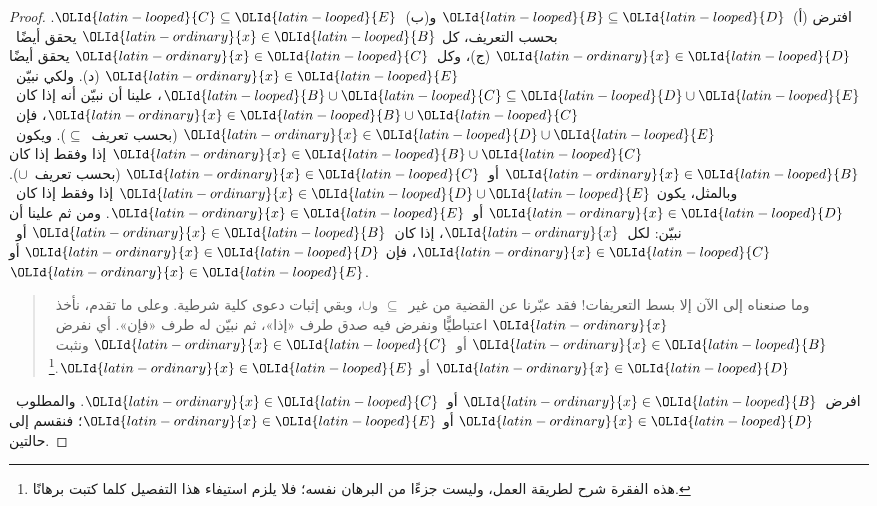 \documentclass[../../../include/open-logic-section]{subfiles}
\begin{document}
\begin{proof}
  افترض (أ)~${\OLId{latin-looped}{B}} \subseteq {\OLId{latin-looped}{D}}$ و(ب)~${\OLId{latin-looped}{C}} \subseteq {\OLId{latin-looped}{E}}$. بحسب التعريف، كل
  ${\OLId{latin-ordinary}{x}} \in {\OLId{latin-looped}{B}}$ يحقق أيضًا~${\OLId{latin-ordinary}{x}} \in {\OLId{latin-looped}{D}}$ (ج)، وكل~${\OLId{latin-ordinary}{x}} \in {\OLId{latin-looped}{C}}$ يحقق أيضًا
  ${\OLId{latin-ordinary}{x}} \in {\OLId{latin-looped}{E}}$ (د). ولكي نبيّن~${\OLId{latin-looped}{B}} \cup {\OLId{latin-looped}{C}} \subseteq {\OLId{latin-looped}{D}} \cup {\OLId{latin-looped}{E}}$، علينا أن
  نبيّن أنه إذا كان~${\OLId{latin-ordinary}{x}} \in {\OLId{latin-looped}{B}} \cup {\OLId{latin-looped}{C}}$، فإن~${\OLId{latin-ordinary}{x}} \in {\OLId{latin-looped}{D}} \cup {\OLId{latin-looped}{E}}$ (بحسب
  تعريف~$\subseteq$). ويكون~${\OLId{latin-ordinary}{x}} \in {\OLId{latin-looped}{B}} \cup {\OLId{latin-looped}{C}}$ إذا وفقط إذا كان
  ${\OLId{latin-ordinary}{x}} \in {\OLId{latin-looped}{B}}$ أو~${\OLId{latin-ordinary}{x}} \in {\OLId{latin-looped}{C}}$ (بحسب تعريف~$\cup$). وبالمثل، يكون
  ${\OLId{latin-ordinary}{x}} \in {\OLId{latin-looped}{D}} \cup {\OLId{latin-looped}{E}}$ إذا وفقط إذا كان~${\OLId{latin-ordinary}{x}} \in {\OLId{latin-looped}{D}}$ أو~${\OLId{latin-ordinary}{x}} \in {\OLId{latin-looped}{E}}$. ومن ثم
  علينا أن نبيّن: لكل~${\OLId{latin-ordinary}{x}}$، إذا كان~${\OLId{latin-ordinary}{x}} \in {\OLId{latin-looped}{B}}$ أو~${\OLId{latin-ordinary}{x}} \in {\OLId{latin-looped}{C}}$، فإن
  ${\OLId{latin-ordinary}{x}} \in {\OLId{latin-looped}{D}}$ أو~${\OLId{latin-ordinary}{x}} \in {\OLId{latin-looped}{E}}$.

  \begin{quote}
  وما صنعناه إلى الآن إلا بسط التعريفات!{} فقد عبّرنا عن القضية من
  غير~$\subseteq$ و$\cup$، وبقي إثبات دعوى كلية شرطية. وعلى ما تقدم،
  نأخذ~${\OLId{latin-ordinary}{x}}$ اعتباطيًّا ونفرض فيه صدق طرف «إذا»، ثم نبيّن له طرف «فإن».
  أي نفرض~${\OLId{latin-ordinary}{x}} \in {\OLId{latin-looped}{B}}$ أو~${\OLId{latin-ordinary}{x}} \in {\OLId{latin-looped}{C}}$ ونثبت~${\OLId{latin-ordinary}{x}} \in {\OLId{latin-looped}{D}}$ أو
  ${\OLId{latin-ordinary}{x}} \in {\OLId{latin-looped}{E}}$.\footnote{هذه الفقرة شرح لطريقة العمل، وليست جزءًا من
  البرهان نفسه؛ فلا يلزم استيفاء هذا التفصيل كلما كتبت برهانًا.}
  \end{quote}

  افرض~${\OLId{latin-ordinary}{x}} \in {\OLId{latin-looped}{B}}$ أو~${\OLId{latin-ordinary}{x}} \in {\OLId{latin-looped}{C}}$. والمطلوب~${\OLId{latin-ordinary}{x}} \in {\OLId{latin-looped}{D}}$ أو
  ${\OLId{latin-ordinary}{x}} \in {\OLId{latin-looped}{E}}$؛ فنقسم إلى حالتين.


\end{proof}
\end{document}
